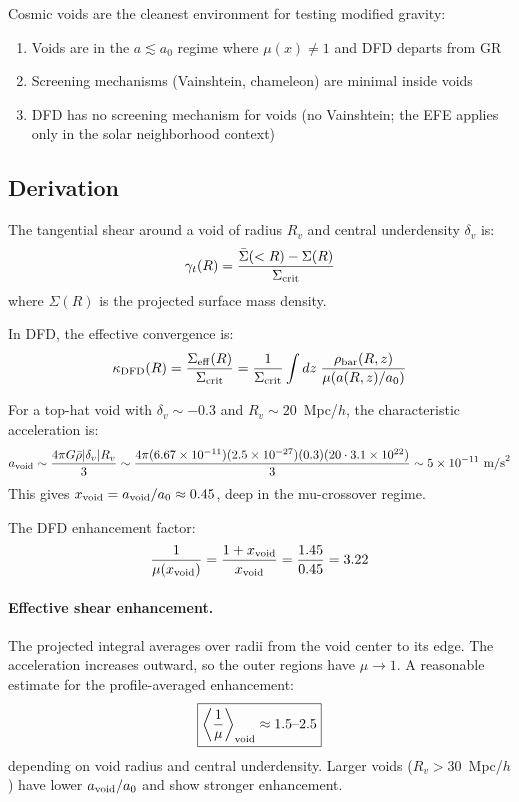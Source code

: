 \documentclass[11pt,a4paper]{article}
\newcommand{\ee}[1]{\times 10^{#1}}
\begin{document}
Cosmic voids are the cleanest environment for testing
modified gravity:
\begin{enumerate}
\item Voids are in the $a \lesssim a_0$ regime where
  $\mu(x) \neq 1$ and DFD departs from GR
\item Screening mechanisms (Vainshtein, chameleon) are
  minimal inside voids
\item DFD has no screening mechanism for voids (no
  Vainshtein; the EFE applies only in the solar
  neighborhood context)
\end{enumerate}

\subsection{Derivation}

The tangential shear around a void of radius $R_v$ and
central underdensity $\delta_v$ is:
\begin{equation}
\gamma_t(R) = \frac{\bar{\Sigma}(< R) - \Sigma(R)}{\Sigma_{\rm crit}}
\end{equation}
where $\Sigma(R)$ is the projected surface mass density.

In DFD, the effective convergence is:
\begin{equation}
\kappa_{\rm DFD}(R) = \frac{\Sigma_{\rm eff}(R)}{\Sigma_{\rm crit}}
= \frac{1}{\Sigma_{\rm crit}}
\int dz\;\frac{\rho_{\rm bar}(R,z)}{\mu(a(R,z)/a_0)}
\end{equation}

For a top-hat void with $\delta_v \sim -0.3$ and
$R_v \sim 20$~Mpc/$h$, the characteristic acceleration is:
\begin{equation}
a_{\rm void} \sim \frac{4\pi G \bar{\rho} |\delta_v| R_v}{3}
\sim \frac{4\pi (6.67\ee{-11})(2.5\ee{-27})(0.3)(20 \cdot 3.1\ee{22})}{3}
\sim 5\ee{-11}~\text{m/s}^2
\end{equation}
This gives $x_{\rm void} = a_{\rm void}/a_0 \approx 0.45$,
deep in the mu-crossover regime.

The DFD enhancement factor:
\begin{equation}
\frac{1}{\mu(x_{\rm void})} = \frac{1 + x_{\rm void}}{x_{\rm void}}
= \frac{1.45}{0.45} = 3.22
\end{equation}

\paragraph{Effective shear enhancement.}
The projected integral averages over radii from the void
center to its edge.  The acceleration increases outward,
so the outer regions have $\mu \to 1$.  A reasonable
estimate for the profile-averaged enhancement:
\begin{equation}
\boxed{
\left\langle \frac{1}{\mu} \right\rangle_{\rm void}
\approx 1.5\text{--}2.5
}
\end{equation}
depending on void radius and central underdensity.  Larger
voids ($R_v > 30$~Mpc/$h$) have lower $a_{\rm void}/a_0$
and show stronger enhancement.
\end{document}
